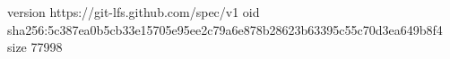 version https://git-lfs.github.com/spec/v1
oid sha256:5c387ea0b5cb33e15705e95ee2c79a6e878b28623b63395c55c70d3ea649b8f4
size 77998

